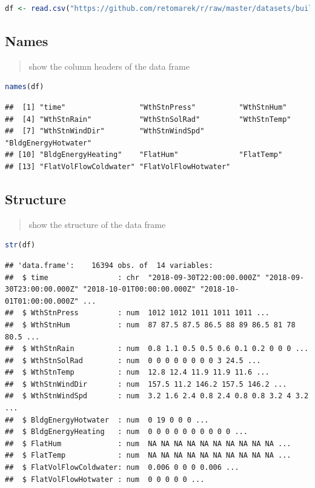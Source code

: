 \documentclass[
]{book}
\begin{document}
\begin{lstlisting}[language=R]
df <- read.csv("https://github.com/retomarek/r/raw/master/datasets/buildingMonitoringTestDataSet.csv", stringsAsFactors=FALSE, sep ="," )
\end{lstlisting}

\hypertarget{names}{%
\subsection{Names}\label{names}}

\begin{quote}
show the column headers of the data frame
\end{quote}

\begin{lstlisting}[language=R]
names(df)
\end{lstlisting}

\begin{lstlisting}
##  [1] "time"                 "WthStnPress"          "WthStnHum"           
##  [4] "WthStnRain"           "WthStnSolRad"         "WthStnTemp"          
##  [7] "WthStnWindDir"        "WthStnWindSpd"        "BldgEnergyHotwater"  
## [10] "BldgEnergyHeating"    "FlatHum"              "FlatTemp"            
## [13] "FlatVolFlowColdwater" "FlatVolFlowHotwater"
\end{lstlisting}

\hypertarget{structure}{%
\subsection{Structure}\label{structure}}

\begin{quote}
show the structure of the data frame
\end{quote}

\begin{lstlisting}[language=R]
str(df)
\end{lstlisting}

\begin{lstlisting}
## 'data.frame':    16394 obs. of  14 variables:
##  $ time                : chr  "2018-09-30T22:00:00.000Z" "2018-09-30T23:00:00.000Z" "2018-10-01T00:00:00.000Z" "2018-10-01T01:00:00.000Z" ...
##  $ WthStnPress         : num  1012 1012 1011 1011 1011 ...
##  $ WthStnHum           : num  87 87.5 87.5 86.5 88 89 86.5 81 78 80.5 ...
##  $ WthStnRain          : num  0.8 1.1 0.5 0.5 0.6 0.1 0.2 0 0 0 ...
##  $ WthStnSolRad        : num  0 0 0 0 0 0 0 0 3 24.5 ...
##  $ WthStnTemp          : num  12.8 12.4 11.9 11.9 11.6 ...
##  $ WthStnWindDir       : num  157.5 11.2 146.2 157.5 146.2 ...
##  $ WthStnWindSpd       : num  3.2 1.6 2.4 0.8 2.4 0.8 0.8 3.2 4 3.2 ...
##  $ BldgEnergyHotwater  : num  0 19 0 0 0 ...
##  $ BldgEnergyHeating   : num  0 0 0 0 0 0 0 0 0 0 ...
##  $ FlatHum             : num  NA NA NA NA NA NA NA NA NA NA ...
##  $ FlatTemp            : num  NA NA NA NA NA NA NA NA NA NA ...
##  $ FlatVolFlowColdwater: num  0.006 0 0 0 0.006 ...
##  $ FlatVolFlowHotwater : num  0 0 0 0 0 ...
\end{lstlisting}
\end{document}
